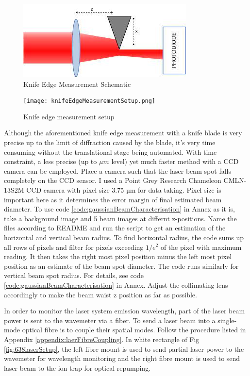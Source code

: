 \documentclass[12pt]{report}
\begin{document}
\begin{figure}[H]
    \centering
    \includegraphics[width=.6\textwidth]{knifeEdgeMeasurement.jpeg}
    \caption{Knife Edge Measurement Schematic}
    \label{fig:knifeEdgeMeasurement}
\end{figure}

\begin{figure}[H]
    \centering
    \texttt{[image: knifeEdgeMeasurementSetup.png]}
    \caption{Knife edge measurement setup}
    \label{fig:knifeEdgeMeasurementSetup}
\end{figure}

Although the aforementioned knife edge measurement with a knife blade is very precise up to the limit of diffraction caused by the blade, it's very time consuming without the translational stage being automated. With time constraint, a less precise (up to $\mu m$ level) yet much faster method with a CCD camera can be employed. Place a camera such that the laser beam spot falls completely on the CCD sensor.  I used a Point Grey Research Chameleon CMLN-13S2M CCD camera with pixel size 3.75 µm for data taking. Pixel size is important here as it determines the error margin of final estimated beam diameter. To use code \ref{code:gaussianBeamCharacterisation} in Annex as it is, take a background image and 5 beam images at differnt z-positions. Name the files according to README and run the script to get an estimation of the horizontal and vertical beam radius. To find horizontal radius, the code sums up all rows of pixels and filter for pixels exceeding $1/e^2$ of the pixel with maximum reading. It then takes the right most pixel position minus the left most pixel position as an estimate of the beam spot diameter. The code runs similarly for vertical beam spot radius. For details, see code \ref{code:gaussianBeamCharacterisation} in Annex. Adjust the collimating lens accordingly to make the beam waist z position as far as possible. 
\par
In order to monitor the laser system emission wavelength, part of the laser beam power is sent to the wavemeter via a fiber. To send a laser beam into a single-mode optical fibre is to couple their spatial modes. Follow the procedure listed in Appendix \ref{appendix:laerFibreCoupling}. In white rectangle of Fig \ref{fig:638laserSetup}, the left fibre mount is used to send partial laser power to the wavemeter for wavelength monitoring and the right fibre mount is used to send laser beam to the ion trap for optical repumping. 
\end{document}
